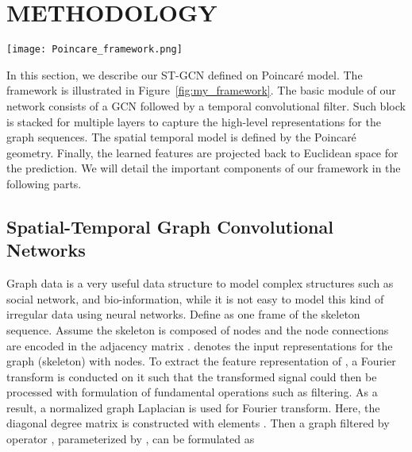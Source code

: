 \documentclass[letterpaper]{article} \usepackage{aaai19}  \usepackage{times}  \usepackage{helvet} \usepackage{courier}  \usepackage[hyphens]{url}  \usepackage{graphicx} \urlstyle{rm} \def\UrlFont{\rm}  \usepackage{graphicx}  \frenchspacing  \setlength{\pdfpagewidth}{8.5in}  \setlength{\pdfpageheight}{11in}
\begin{document}
\section{METHODOLOGY}\label{sec:method}

\begin{figure*}
    \centering
    \texttt{[image: Poincare\_framework.png]}
    \caption{Illustration of our framework. There are mainly three stages in our framework,  including (a) Graph feature embedding, (b) Extracting graph in Poincar\'e model, and (c) Classification in the Euclidean space. At the first stage, we utilize GCN filters to capture the graph representation for each frame and temporal filters are then used to capture the dynamic information. With this output from the first stage, we mix different dimensions and then project them to the tangent space, where an ST-GCN is used to extract higher-level graph representations. The feature then is mapped back to the manifold. In this way, we model the graph on the Riemannian manifold. Note here, the ST-GCN is based on the same module in stage (a) and the manifold space here is on Poincar\'e model. We stack several modules from stage (b) to capture higher-level semantic representations. After that, as shown in stage (c), the graph feature is projected back to Euclidean space such that a Euclidean loss function can be used to optimize this process.}
    \label{fig:my_framework}
\end{figure*}

In this section, we describe our ST-GCN defined on Poincar\'e model. The framework is illustrated in Figure~\ref{fig:my_framework}. The basic module of our network consists of a GCN followed by a temporal convolutional filter. Such block is stacked for multiple layers to capture the high-level representations for the graph sequences. The spatial temporal model is defined by the Poincar\'e geometry. Finally, the learned features are projected back to Euclidean space for the prediction. We will detail the important components of our framework in the following parts.

\subsection{Spatial-Temporal Graph Convolutional Networks}

Graph data is a very useful data structure to model complex structures such as social network, and bio-information, while it is not easy to model this kind of irregular data using neural networks. Define  as one frame of the skeleton sequence. Assume the skeleton is composed of  nodes and the node connections are encoded in the adjacency matrix .  denotes the input representations for the graph (skeleton) with  nodes. To extract the feature representation of , a Fourier transform is conducted on it such that the transformed signal could then be processed with formulation of fundamental operations such as filtering. As a result, a normalized graph Laplacian  is used for Fourier transform. Here, the diagonal degree matrix  is constructed with elements . Then a graph filtered by operator , parameterized by , can be formulated as
\end{document}
